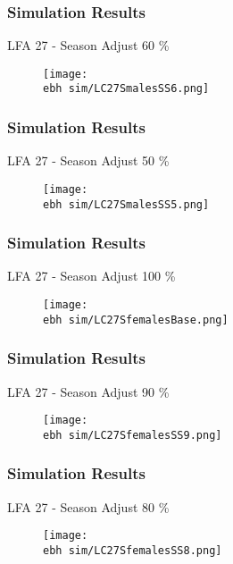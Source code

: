 \documentclass{beamer}
\newcommand{\ebh}{\string~/bio.data/bio.lobster/figures/LFA2733Framework2018/} %
\begin{document}
\begin{frame}
\frametitle{Simulation Results}
LFA 27 - Season Adjust 60 \%
\begin{figure}
        \begin{center}
            \texttt{[image: \\ebh sim/LC27SmalesSS6.png]}
        \end{center}
    \end{figure}
\end{frame}


\begin{frame}
\frametitle{Simulation Results}
LFA 27 - Season Adjust 50 \%
\begin{figure}
        \begin{center}
            \texttt{[image: \\ebh sim/LC27SmalesSS5.png]}
        \end{center}
    \end{figure}
\end{frame}




\begin{frame}
\frametitle{Simulation Results}
LFA 27 - Season Adjust 100 \%
\begin{figure}
        \begin{center}
            \texttt{[image: \\ebh sim/LC27SfemalesBase.png]}
        \end{center}
    \end{figure}
\end{frame}


\begin{frame}
\frametitle{Simulation Results}
LFA 27 - Season Adjust 90 \%
\begin{figure}
        \begin{center}
            \texttt{[image: \\ebh sim/LC27SfemalesSS9.png]}
        \end{center}
    \end{figure}
\end{frame}


\begin{frame}
\frametitle{Simulation Results}
LFA 27 - Season Adjust 80 \%
\begin{figure}
        \begin{center}
            \texttt{[image: \\ebh sim/LC27SfemalesSS8.png]}
        \end{center}
    \end{figure}
\end{frame}
\end{document}
